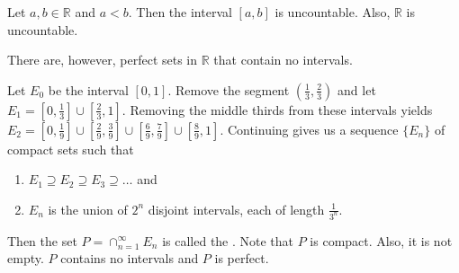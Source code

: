 \documentclass{jacky}
\newcommand{\rr}{\mathbb{R}}
\begin{document}
\begin{prop}
  Let $a,b\in\rr$ and $a<b$. Then the interval $[a,b]$ is uncountable. Also,
  $\rr$ is uncountable.
\end{prop}

\begin{note}
  There are, however, perfect sets in $\rr$ that contain no intervals.
\end{note}

\begin{ex}
  Let $E_0$ be the interval $[0,1]$. Remove the segment
  $(\frac{1}{3},\frac{2}{3})$ and let $E_1=[0,\frac{1}{3}]
  \cup[\frac{2}{3},1]$. Removing the middle thirds from these intervals yields
  $E_2=[0,\frac{1}{9}] \cup[\frac{2}{9},\frac{3}{9}]
  \cup[\frac{6}{9},\frac{7}{9}] \cup[\frac{8}{9},1]$. Continuing gives us a
  sequence $\{E_n\}$ of compact sets such that
  \begin{enumerate}
    \item $E_1\supseteq E_2\supseteq E_3\supseteq\ldots$ and
    \item $E_n$ is the union of $2^n$ disjoint intervals, each of length
      $\frac{1}{3^n}$.
  \end{enumerate}
  Then the set $P=\cap_{n=1}^\infty E_n$ is called the .
  Note that $P$ is compact. Also, it is not empty. $P$ contains no intervals
  and $P$ is perfect.
\end{ex}
\end{document}
